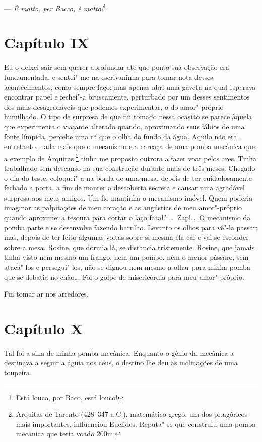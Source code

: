--- \textit{È matto, per Bacco, è matto!}\footnote{ Está louco, por Baco, está
louco!}

\section*{Capítulo IX}

 Eu o deixei sair sem querer aprofundar até que ponto sua observação era
fundamentada, e sentei"-me na escrivaninha para tomar nota desses
acontecimentos, como sempre faço; mas apenas abri uma gaveta na qual
esperava encontrar papel e fechei"-a bruscamente, perturbado por um
desses sentimentos dos mais desagradáveis que podemos experimentar, o
do amor"-próprio humilhado. O tipo de surpresa de que fui tomado nessa
ocasião se parece àquela que experimenta o viajante alterado quando,
aproximando seus lábios de uma fonte límpida, percebe uma rã que o olha
do fundo da água. Aquilo não era, entretanto, nada mais que o mecanismo
e a carcaça de uma pomba mecânica que, a exemplo de Arquitas,\footnote{
Arquitas de Tarento (428--347 a.C.), matemático grego, um dos
pitagóricos mais importantes, influenciou Euclides. Reputa"-se que
construiu uma pomba mecânica que teria voado 200m.} tinha me
proposto outrora a fazer voar pelos ares. Tinha trabalhado sem descanso
na sua construção durante mais de três meses. Chegado o dia do teste,
coloquei"-a na borda de uma mesa, depois de ter cuidadosamente fechado a
porta, a fim de manter a descoberta secreta e causar uma agradável
surpresa aos meus amigos. Um fio mantinha o mecanismo imóvel. Quem
poderia imaginar as palpitações de meu coração e as angústias de meu
amor"-próprio quando aproximei a tesoura para cortar o laço fatal?
\ldots\ Zap!\ldots\ O mecanismo da pomba parte e se desenvolve fazendo barulho.
Levanto os olhos para vê"-la passar; mas, depois de ter feito algumas
voltas sobre si mesma ela cai e vai se esconder sobre a mesa. Rosine,
que dormia lá, se distancia tristemente. Rosine, que jamais tinha visto
nem mesmo um frango, nem um pombo, nem o menor pássaro, sem atacá"-los e
persegui"-los, não se dignou nem mesmo a olhar para minha pomba que se
debatia no chão\ldots\ Foi o golpe de misericórdia para meu amor"-próprio.

Fui tomar ar nos arredores.

\section*{Capítulo X}

 Tal foi a sina de minha pomba mecânica. Enquanto o gênio da mecânica a
destinava a seguir a águia nos céus, o destino lhe deu as inclinações
de uma toupeira. 

